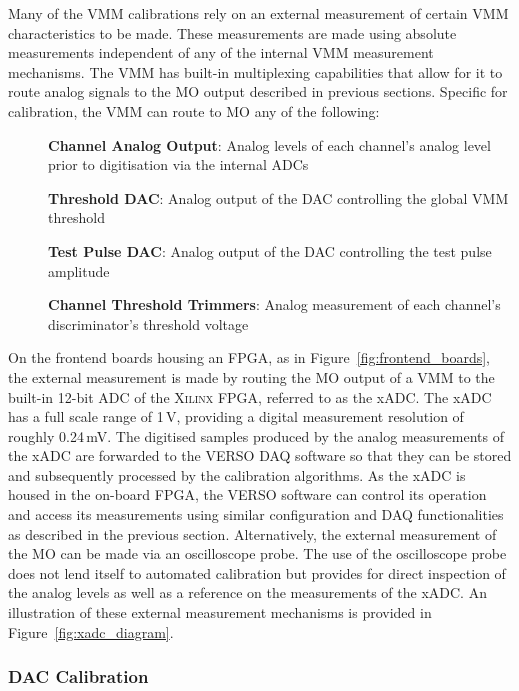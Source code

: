 Many of the VMM calibrations rely on an external measurement of certain VMM characteristics
to be made.
These measurements are made using absolute measurements independent of any of the
internal VMM measurement mechanisms.
The VMM has built-in multiplexing capabilities that allow for it to route analog signals
to the MO output described in previous sections.
Specific for calibration, the VMM can route to MO any of the following:
\begin{description}
    \item[] \textbf{Channel Analog Output}: Analog levels of each channel's analog level prior to digitisation via the internal ADCs
    \item[] \textbf{Threshold DAC}: Analog output of the DAC controlling the global VMM threshold
    \item[] \textbf{Test Pulse DAC}: Analog output of the DAC controlling the test pulse amplitude
    \item[] \textbf{Channel Threshold Trimmers}: Analog measurement of each channel's discriminator's threshold voltage
\end{description}
On the frontend boards housing an FPGA, as in Figure~\ref{fig:frontend_boards}, the external measurement
is made by routing the MO output of a VMM to the built-in 12-bit ADC of the \textsc{Xilinx} FPGA, referred to as
the xADC.
The xADC has a full scale range of 1\,V, providing a digital measurement resolution of roughly 0.24\,mV.
The digitised samples produced by the analog measurements of the xADC are forwarded to the VERSO
DAQ software so that they can be stored and subsequently processed by the calibration algorithms.
As the xADC is housed in the on-board FPGA, the VERSO software can control its operation and access its measurements
using similar configuration and DAQ functionalities as described in the previous section.
Alternatively, the external measurement of the MO can be made via an oscilloscope probe.
The use of the oscilloscope probe does not lend itself to automated calibration but provides for
direct inspection of the analog levels as well as a reference on the measurements of the xADC.
An illustration of these external measurement mechanisms is provided in Figure~\ref{fig:xadc_diagram}.

\subsubsection{DAC Calibration}
\label{sec:calib_dac}

